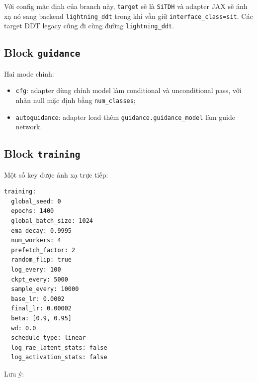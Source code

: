 Với config mặc định của branch này, \texttt{target} sẽ là \texttt{SiTDH} và
adapter JAX sẽ ánh xạ nó sang backend \texttt{lightning\_ddt} trong khi vẫn giữ
\texttt{interface\_class=sit}. Các target DDT legacy cũng đi cùng đường
\texttt{lightning\_ddt}.

\subsection{Block \texttt{guidance}}

Hai mode chính:

\begin{itemize}[leftmargin=1.5em]
  \item \texttt{cfg}: adapter dùng chính model làm conditional và unconditional
  pass, với nhãn null mặc định bằng \texttt{num\_classes};
  \item \texttt{autoguidance}: adapter load thêm
  \texttt{guidance.guidance\_model} làm guide network.
\end{itemize}

\subsection{Block \texttt{training}}

Một số key được ánh xạ trực tiếp:

\begin{lstlisting}[style=rae]
training:
  global_seed: 0
  epochs: 1400
  global_batch_size: 1024
  ema_decay: 0.9995
  num_workers: 4
  prefetch_factor: 2
  random_flip: true
  log_every: 100
  ckpt_every: 5000
  sample_every: 10000
  base_lr: 0.0002
  final_lr: 0.00002
  beta: [0.9, 0.95]
  wd: 0.0
  schedule_type: linear
  log_rae_latent_stats: false
  log_activation_stats: false
\end{lstlisting}

Lưu ý:

